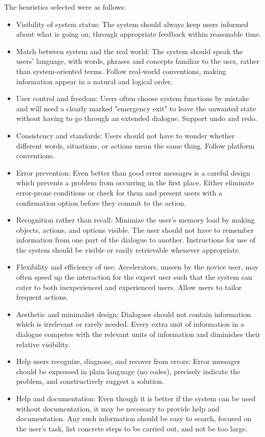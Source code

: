 \documentclass{article}
\begin{document}
The heuristics selected were as follows: 
\begin{itemize}
\item Visibility of system status: The system should always keep users informed about what is
going on, through appropriate feedback within reasonable time. 

\item Match between system and the real world: The system should speak the users' language,
with words, phrases and concepts familiar to the user, rather than system-oriented terms.
Follow real-world conventions, making information appear in a natural and logical order.
 
\item User control and freedom: Users often choose system functions by mistake and will need
a clearly marked "emergency exit" to leave the unwanted state without having to go through an
extended dialogue. Support undo and redo. 

\item Consistency and standards: Users should not have to wonder whether different words,
situations, or actions mean the same thing. Follow platform conventions. 

\item Error prevention: Even better than good error messages is a careful design which
prevents a problem from occurring in the first place. Either eliminate error-prone conditions
or check for them and present users with a confirmation option before they commit to the
action. 

\item Recognition rather than recall: Minimize the user's memory load by making objects,
actions, and options visible. The user should not have to remember information from one part
of the dialogue to another. Instructions for use of the system should be visible or easily
retrievable whenever appropriate. 

\item Flexibility and efficiency of use: Accelerators, unseen by the novice user, may often
speed up the interaction for the expert user such that the system can cater to both
inexperienced and experienced users. Allow users to tailor frequent actions. 
    
\item Aesthetic and minimalist design: Dialogues should not contain information which is
irrelevant or rarely needed. Every extra unit of information in a dialogue competes with the
relevant units of information and diminishes their relative visibility. 
    
\item Help users recognize, diagnose, and recover from errors: Error messages should be
expressed in plain language (no codes), precisely indicate the problem, and constructively
suggest a solution. 
    
\item Help and documentation: Even though it is better if the system can be used without
documentation, it may be necessary to provide help and documentation. Any such information
should be easy to search, focused on the user's task, list concrete steps to be carried out,
and not be too large.    
\end{itemize}
\end{document}
